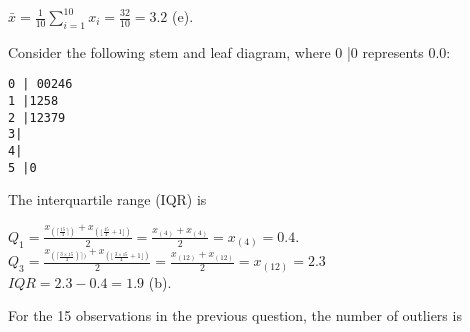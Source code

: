 \documentclass[bigtut]{tutorial}
\begin{document}
\begin{tutorial}
\begin{questions}
\begin{solution}
$\bar{x} = \frac{1}{10} \sum_{i=1}^{10} x_{i}  = \frac{32}{10} = 3.2$ (e).
\end{solution}

\question 
Consider the following stem and leaf diagram, where 0 |0 represents 0.0: 
\begin{verbatim}
0 | 00246
1 |1258 
2 |12379 
3|
4|
5 |0
\end{verbatim} 

The interquartile range (IQR) is 

\begin{solution}
$Q_{1} = \frac{ x_{(\lceil \frac{15}{4}  \rceil  )} + x_{( \lfloor\frac{15}{4} +1  \rfloor )} }{2} = \frac{ x_{(4)} + x_{(4)} }{2} = x_{(4)} = 0.4$. \\
$Q_{3} = \frac{x_{ ( \lceil   \frac{3 \times 15}{4})  \rceil  )} + x_{ (\lfloor \frac{3 \times 15}{4} +1  \rfloor )} }{2} = \frac{ x_{(12)} + x_{(12)} }{2} = x_{(12)} = 2.3$ \\
$IQR = 2.3-0.4= 1.9$ (b).
\end{solution}

\question
For the 15 observations in the previous question, the number of outliers is 
\begin{parts}[5]

\end{parts}
\end{questions}
\end{tutorial}
\end{document}
